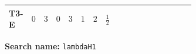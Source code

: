 \documentclass[8pt]{article}
\begin{document}
\begin{landscape}
\begin{longtable}{@{}llcccccc >{\raggedright\arraybackslash}p{0.21\linewidth} >{\raggedright\arraybackslash}p{0.21\linewidth} >{\raggedright\arraybackslash}p{0.21\linewidth}@{}}
\midrule
T3-E & $0$ & $3$ & $0$ & $3$ & $1$ & $2$ & $\frac{1}{2}$ & \scriptsize\adjustbox{max width=\linewidth}{$\begin{gathered} -\frac{3 {g_Y}^2 {\lambda_{H1}}}{2}\end{gathered}$} & \scriptsize\adjustbox{max width=\linewidth}{$\begin{gathered} {\lambda_{H1}} (6 \operatorname{Tr}\!\left({Y_d}\,\left({Y_d}\right)^{\dagger}\right)+2 \operatorname{Tr}\!\left({Y_e}\,\left({Y_e}\right)^{\dagger}\right)+6 \operatorname{Tr}\!\left({Y_u}\,\left({Y_u}\right)^{\dagger}\right)+4 {\lambda_{S_1}^{\rm Adj}})\end{gathered}$} & \scriptsize\adjustbox{max width=\linewidth}{$\begin{gathered} +6 {g_2}^4\end{gathered}$} \\
\midrule
\bottomrule
\end{longtable}
\clearpage
\noindent\textbf{Search name: }\texttt{lambdaH1}\par\smallskip

\end{landscape}
\end{document}
